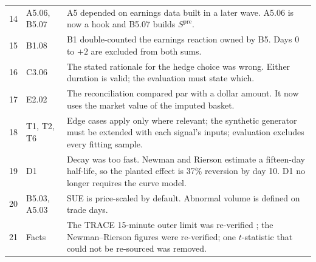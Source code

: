 \documentclass[11pt,letterpaper]{article}
\begin{document}
{\begin{longtable}{@{}p{}p{}p{}@{}}
14 & A5.06, B5.07 & A5 depended on earnings data built in a later wave. A5.06 is now a hook and B5.07 builds $S^{\mathrm{pre}}$. \\
15 & B1.08 & B1 double-counted the earnings reaction owned by B5. Days 0 to $+2$ are excluded from both sums. \\
16 & C3.06 & The stated rationale for the hedge choice was wrong. Either duration is valid; the evaluation must state which. \\
17 & E2.02 & The reconciliation compared par with a dollar amount. It now uses the market value of the imputed basket. \\
18 & T1, T2, T6 & Edge cases apply only where relevant; the synthetic generator must be extended with each signal's inputs; evaluation excludes every fitting sample. \\
19 & D1 & Decay was too fast. Newman and Rierson \cite{nr2004} estimate a fifteen-day half-life, so the planted effect is 37\% reversion by day 10. D1 no longer requires the curve model. \\
20 & B5.03, A5.03 & SUE is price-scaled by default. Abnormal volume is defined on trade days. \\
21 & Facts & The TRACE 15-minute outer limit was re-verified \cite{sec2025}; the Newman--Rierson figures were re-verified; one $t$-statistic that could not be re-sourced was removed. \\
\bottomrule
\end{longtable}
}
\end{document}
